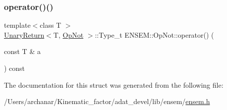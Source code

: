 \mbox{\label{structENSEM_1_1OpNot_a0e48693c476abfbda4c8abafefe17ad9}} 
\subsubsection{\texorpdfstring{operator()()}{operator()()}\hspace{0.1cm}{\footnotesize\ttfamily [2/2]}}
{\footnotesize\ttfamily template$<$class T $>$ \\
\mbox{\hyperlink{structENSEM_1_1UnaryReturn}{Unary\+Return}}$<$T, \mbox{\hyperlink{structENSEM_1_1OpNot}{Op\+Not}} $>$\+::Type\+\_\+t E\+N\+S\+E\+M\+::\+Op\+Not\+::operator() (\begin{DoxyParamCaption}\item[{const T \&}]{a }\end{DoxyParamCaption}) const\hspace{0.3cm}{\ttfamily [inline]}}



The documentation for this struct was generated from the following file\+:\begin{DoxyCompactItemize}
\item 
/\+Users/archanar/\+Kinematic\+\_\+factor/adat\+\_\+devel/lib/ensem/\mbox{\hyperlink{lib_2ensem_2ensem_8h}{ensem.\+h}}\end{DoxyCompactItemize}
